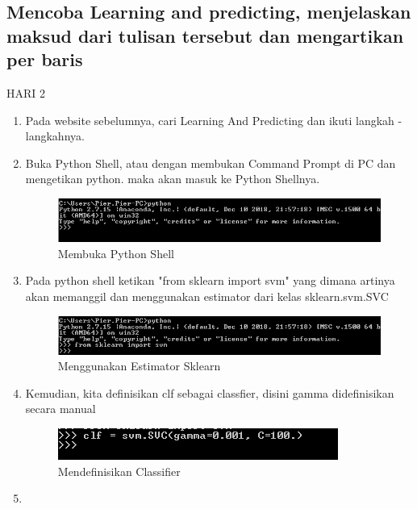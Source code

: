 \subsection{Mencoba Learning and predicting, menjelaskan maksud dari tulisan tersebut dan mengartikan per baris}
HARI 2

\begin{enumerate}
\item
Pada website sebelumnya, cari Learning And Predicting dan ikuti langkah -langkahnya.
\item
Buka Python Shell, atau dengan membukan Command Prompt di PC dan mengetikan python. maka akan masuk ke Python Shellnya.
\begin{figure}
	\begin{center}
   	 \includegraphics[scale=1]{figures/tasya1.png}
   	 \caption{Membuka Python Shell}	
	\end{center}
\end{figure}
\item
Pada python shell ketikan "from sklearn import svm" yang dimana artinya akan memanggil dan menggunakan estimator dari kelas sklearn.svm.SVC
\begin{figure}
	\begin{center}
   	 \includegraphics[scale=1]{figures/tasya2.png}
   	 \caption{Menggunakan Estimator Sklearn }	
	\end{center}
\end{figure}
\item
Kemudian, kita definisikan clf sebagai classfier, disini gamma didefinisikan secara manual
\begin{figure}
	\begin{center}
   	 \includegraphics[scale=1]{figures/tasya3.png}
   	 \caption{Mendefinisikan Classifier }	
	\end{center}
\end{figure}
\item

\end{enumerate}
